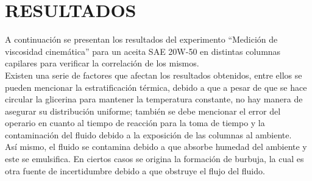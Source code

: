 \documentclass[12pt, letterpaper]{article}
\begin{document}
\section{RESULTADOS}

A continuación se presentan los resultados del experimento “Medición de viscosidad cinemática” para un aceita SAE 20W-50 en distintas columnas capilares para verificar la correlación de los mismos.\\
Existen una serie de factores que afectan los resultados obtenidos, entre ellos se pueden mencionar la estratificación térmica, debido a que a pesar de que se hace circular la glicerina para mantener la temperatura constante, no hay manera de asegurar su distribución uniforme; también se debe mencionar el error del operario en cuanto al tiempo de reacción para la toma de tiempo y la contaminación del fluido debido a la exposición de las columnas al ambiente.\\
Así mismo, el fluido se contamina debido a que absorbe humedad del ambiente y este se emulsifica. En ciertos casos se origina la formación de burbuja, la cual es otra fuente de incertidumbre debido a que obstruye el flujo del fluido.


\end{document}

